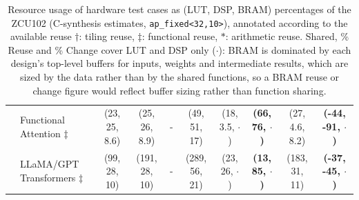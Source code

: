\begin{table}[!tbh]
\begin{tabular}{L{0.8cm}L{2.6cm}cccccccc}
        & Functional Attention $\ddagger$ & (23, 25, 8.6) & (25, 26, 8.9) & - & (49, 51, 17) & (18, 3.5, $\cdot$) & \textbf{(66, 76, $\cdot$)} & (27, 4.6, 8.2) & \textbf{(-44, -91, $\cdot$)} \\
        & LLaMA/GPT Transformers $\ddagger$ & (99, 28, 10) & (191, 28, 10) & - & (289, 56, 21) & (23, 26, $\cdot$) & \textbf{(13, 85, $\cdot$)} & (183, 31, 11) & \textbf{(-37, -45, $\cdot$)} \\
    \bottomrule
    \end{tabular}
    \caption{ Resource usage of hardware test cases as (LUT, DSP, BRAM) percentages of the ZCU102 (C-synthesis estimates, \texttt{ap\_fixed<32,10>}), annotated according to the available reuse $\dagger$: tiling reuse, $\ddagger$: functional reuse, $\ast$: arithmetic reuse. Shared, \% Reuse and \% Change cover LUT and DSP only ($\cdot$): BRAM is dominated by each design's top-level buffers for inputs, weights and intermediate results, which are sized by the data rather than by the shared functions, so a BRAM reuse or change figure would reflect buffer sizing rather than function sharing. }
    \label{tab:modularization_results}
\end{table}
